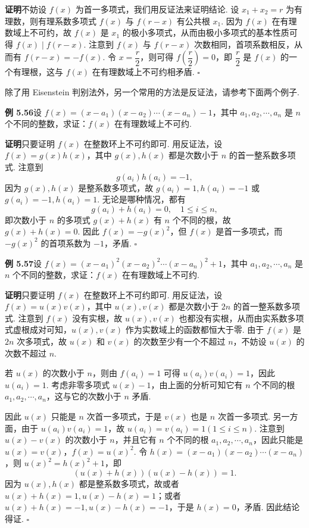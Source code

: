 \documentclass[UTF8, 12pt, fontset=fandol, oneside]{ctexart}
\begin{document}
\noindent\textbf{证明}\quad 不妨设 $f(x)$ 为首一多项式，我们用反证法来证明结论. 设 $x_1+x_2=r$ 为有理数，则有理系数多项式 $f(x)$ 与 $f(r-x)$ 有公共根 $x_1$. 因为 $f(x)$ 在有理数域上不可约，故 $f(x)$ 是 $x_1$ 的极小多项式，从而由极小多项式的基本性质可得 $f(x)\mid f(r-x)$. 注意到 $f(x)$ 与 $f(r-x)$ 次数相同，首项系数相反，从而有 $f(r-x)=-f(x)$. 令 $x=\dfrac r2$，则可得 $f\left(\dfrac r2\right)=0$，即 $\dfrac r2$ 是 $f(x)$ 的一个有理根，这与 $f(x)$ 在有理数域上不可约相矛盾. \hfill $\square$

除了用 Eisenstein 判别法外，另一个常用的方法是反证法，请参考下面两个例子.

\noindent\textbf{例 5.56}\quad 设 $f(x)=(x-a_1)(x-a_2)\cdots(x-a_n)-1$，其中 $a_1,a_2,\cdots,a_n$ 是 $n$ 个不同的整数，求证：$f(x)$ 在有理数域上不可约.

\noindent\textbf{证明}\quad 只要证明 $f(x)$ 在整数环上不可约即可. 用反证法，设 $f(x)=g(x)h(x)$，其中 $g(x),h(x)$ 都是次数小于 $n$ 的首一整系数多项式. 注意到
\[
g(a_i)h(a_i)=-1,
\]
因为 $g(x),h(x)$ 是整系数多项式，故 $g(a_i)=1,h(a_i)=-1$ 或 $g(a_i)=-1,h(a_i)=1$. 无论是哪种情况，都有
\[
g(a_i)+h(a_i)=0,\quad 1\le i\le n,
\]
即次数小于 $n$ 的多项式 $g(x)+h(x)$ 有 $n$ 个不同的根，故 $g(x)+h(x)=0$. 因此 $f(x)=-g(x)^2$，但 $f(x)$ 是首一多项式，而 $-g(x)^2$ 的首项系数为 $-1$，矛盾. \hfill $\square$

\noindent\textbf{例 5.57}\quad 设 $f(x)=(x-a_1)^2(x-a_2)^2\cdots(x-a_n)^2+1$，其中 $a_1,a_2,\cdots,a_n$ 是 $n$ 个不同的整数，求证：$f(x)$ 在有理数域上不可约.

\noindent\textbf{证明}\quad 只要证明 $f(x)$ 在整数环上不可约即可. 用反证法，设 $f(x)=u(x)v(x)$，其中 $u(x),v(x)$ 都是次数小于 $2n$ 的首一整系数多项式. 注意到 $f(x)$ 没有实根，故 $u(x),v(x)$ 也都没有实根，从而由实系数多项式虚根成对可知，$u(x),v(x)$ 作为实数域上的函数都恒大于零. 由于 $f(x)$ 是 $2n$ 次多项式，故 $u(x)$ 和 $v(x)$ 的次数至少有一个不超过 $n$，不妨设 $u(x)$ 的次数不超过 $n$.

若 $u(x)$ 的次数小于 $n$，则由 $f(a_i)=1$ 可得 $u(a_i)v(a_i)=1$，因此 $u(a_i)=1$. 考虑非零多项式 $u(x)-1$，由上面的分析可知它有 $n$ 个不同的根 $a_1,a_2,\cdots,a_n$，这与它的次数小于 $n$ 矛盾.

因此 $u(x)$ 只能是 $n$ 次首一多项式，于是 $v(x)$ 也是 $n$ 次首一多项式. 另一方面，由于 $u(a_i)v(a_i)=1$，故 $u(a_i)=v(a_i)=1(1\le i\le n)$. 注意到 $u(x)-v(x)$ 的次数小于 $n$，并且它有 $n$ 个不同的根 $a_1,a_2,\cdots,a_n$，因此只能是 $u(x)=v(x)$，$f(x)=u(x)^2$. 令 $h(x)=(x-a_1)(x-a_2)\cdots(x-a_n)$，则 $u(x)^2=h(x)^2+1$，即
\[
(u(x)+h(x))(u(x)-h(x))=1.
\]
因为 $u(x),h(x)$ 都是整系数多项式，故或者 $u(x)+h(x)=1,u(x)-h(x)=1$；或者 $u(x)+h(x)=-1,u(x)-h(x)=-1$，于是 $h(x)=0$，矛盾. 因此结论得证. \hfill $\square$
\end{document}
